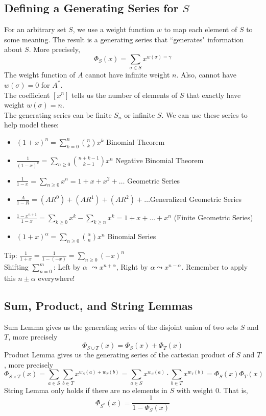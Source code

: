 \documentclass[11pt]{article}
\newcommand{\nl}{\\[5pt]}
\begin{document}
\subsection{Defining a Generating Series for $S$}
For an arbitrary set $S$, we use a weight function $w$ to map each element of $S$ to some meaning. The result is a generating series that ``generates" information about $S$. More precisely, $$\Phi_S(x) = \sum_{\sigma \in S}x^{w(\sigma) = \gamma}$$
The weight function of $A$ cannot have infinite weight $n$. Also, cannot have $w(\sigma) = 0$ for $A^*$.  \nl
The coefficient $[x^n]$ tells us the number of elements of $S$ that exactly have weight $w(\sigma) = n$. \nl
The generating series can be finite $S_n$ or infinite $S$. We can use these series to help model these:
\begin{itemize}
    \setlength\itemsep{1pt}
    \item $(1+x)^n = \sum_{k=0}^n \binom{n}{k}x^k$ \hfill Binomial Theorem
    \item $\frac{1}{(1-x)^k} = \sum_{n\geq0}\binom{n + k -1}{k -1} x^n$ \hfill Negative Binomial Theorem
    \item $\frac{1}{1-x}= \sum_{n \geq 0} x^n = 1 + x+ x^2 + \dots$ \hfill  Geometric Series
    \item $\frac{A}{1-R} = (AR^0) + (AR^1) + (AR^2) + \dots $\hfill Generalized Geometric Series
    \item $\frac{1-x^{n+1}}{1-x}= \sum_{k \geq 0} x^k - \sum_{k \geq n} x^k=  1 + x+ \dots + x^n$ \hfill (Finite Geometric Series)
    \item $(1+x)^{\alpha} = \sum_{n \geq 0} \binom{\alpha}{n} x^n$ \hfill Binomial Series
\end{itemize}
Tip: $\frac{1}{1+x} = \frac{1}{1-(-x)} = \sum_{n \geq 0} (-x)^n$\nl
Shifting $\sum_{n = 0}^m $: Left by $\alpha$ $\leadsto x^{n+\alpha}$, Right by $\alpha \leadsto x^{n - \alpha}$. Remember to apply this $n \pm \alpha$ everywhere!


\subsection{Sum, Product, and String Lemmas}
Sum Lemma gives us the generating series of the disjoint union of two sets $S$ and $T$, more precisely
$$\Phi_{S \cup T}(x) = \Phi_S(x) + \Phi_T(x)$$
Product Lemma gives us the generating series of the cartesian product of $S$ and $T$, more precisely 
$$\Phi_{S \times T}(x) = \sum_{a \in S}\sum_{b \in T}x^{w_S(a) + w_T(b)} = \sum_{a \in S}x^{w_S(a)} \cdot \sum_{b \in T}x^{w_T(b)} = \Phi_S(x)\Phi_T(x)$$
String Lemma only holds if there are no elements in $S$ with weight 0. That is, $$\Phi_{S^*}(x) = \frac{1}{1-\Phi_S(x)}$$
\end{document}
